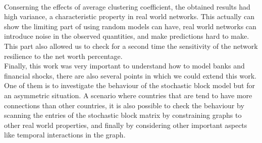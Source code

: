 \documentclass[14pt]{article}
\begin{document}
\\Conserning the effects of average clustering coefficient, the obtained results had high variance, a characteristic property in real world networks. This actually can show the limiting part of using random models can have, real world networks can introduce noise in the observed quantities, and make predictions hard to make. This part also allowed us to check for a second time the sensitivity of the network resilience to the net worth percentage. 
\\Finally, this work was very important to understand how to model banks and financial shocks, there are also several points in which we could extend this work. One of them is to investigate the behaviour of the stochastic block model but for an asymmetric situation. A scenario where countries that are  tend to have more connections than other countries, it is also possible to check the behaviour by scanning the entries of the stochastic block matrix  by constraining graphs to other real world properties, and finally by considering other important aspects like temporal interactions in the graph.


\end{document}
